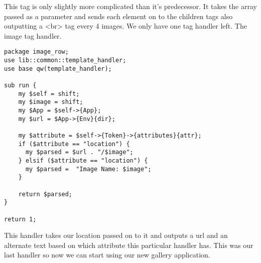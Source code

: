 This tag is only slightly more complicated than it's predecessor. It takes the array passed as a parameter and sends each element on to the children tags also outputting a <br> tag every 4 images. We only have one tag handler left. The image tag handler.
\begin{verbatim}
package image_row;
use lib::common::template_handler;
use base qw(template_handler);

sub run {
    my $self = shift;
    my $image = shift;
    my $App = $self->{App};
    my $url = $App->{Env}{dir};
    
    my $attribute = $self->{Token}->{attributes}{attr};
    if ($attribute == "location") {
      my $parsed = $url . "/$image";
    } elsif ($attribute == "location") {
      my $parsed =  "Image Name: $image";
    }
    
    return $parsed;
}

return 1;
\end{verbatim}
This handler takes our location passed on to it and outputs a url and an alternate text based on which attribute this particular handler has. This was our last handler so now we can start using our new gallery application.